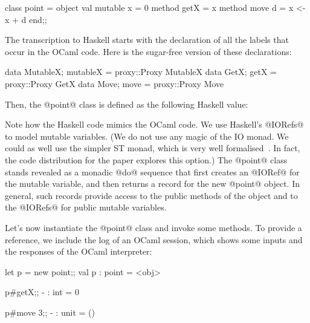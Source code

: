 \antiskip

\begin{code}
 class point =
   object
     val mutable x = 0
     method getX   = x
     method move d = x <- x + d
   end;;
\end{code}

\noindent
The transcription to Haskell starts with the declaration of all the
labels that occur in the OCaml code. Here is the sugar-free version of
these declarations:

\begin{code}
 data MutableX; mutableX = proxy::Proxy MutableX
 data GetX;     getX     = proxy::Proxy GetX
 data Move;     move     = proxy::Proxy Move
\end{code}

\noindent
Then, the @point@ class is defined as the following Haskell value:


\noindent
Note how the Haskell code mimics the OCaml code. We use Haskell's
@IORefs@ to model mutable variables. (We do not use any magic of the
IO monad. We could as well use the simpler ST monad, which is very
well formalised~\cite{LPJ95}. In fact, the code distribution for the
paper explores this option.) The @point@ class stands revealed as a
monadic @do@ sequence that first creates an @IORef@ for the mutable
variable, and then returns a record for the new @point@ object. In
general, such records provide access to the public methods of the
object and to the @IORefs@ for public mutable variables.

Let's now instantiate the @point@ class and invoke some methods. To
provide a reference, we include the log of an OCaml session, which
shows some inputs and the responses of the OCaml interpreter:

\begin{code}
 let p = new point;;
 val p : point = <obj>
\end{code}

\begin{code}
 p#getX;;
 - : int = 0
\end{code}

\begin{code}
 p#move 3;;
 - : unit = ()
\end{code}
 
